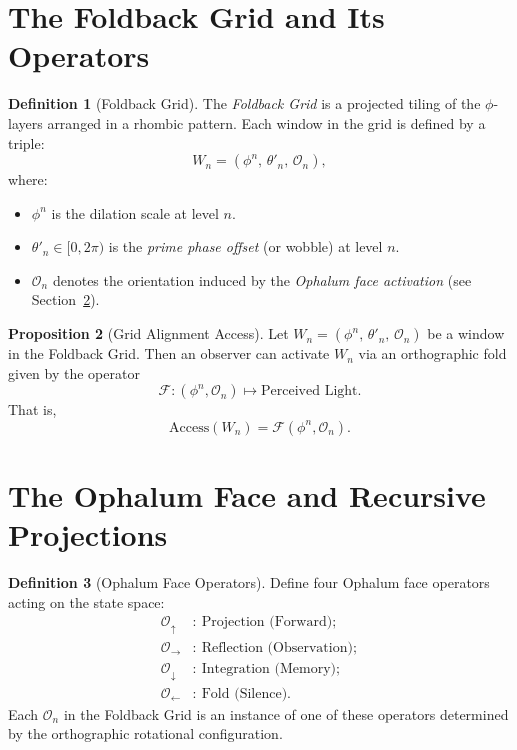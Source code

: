 \documentclass[12pt]{article}
\theoremstyle{definition}
\newtheorem{definition}{Definition}[section]
\newtheorem{proposition}[definition]{Proposition}
\begin{document}
\section{The Foldback Grid and Its Operators}

\begin{definition}[Foldback Grid]
The \emph{Foldback Grid} is a projected tiling of the $\phi$-layers arranged in a rhombic pattern. Each window in the grid is defined by a triple:
\[
W_n = \left( \phi^n,\, \theta'_n,\, \mathcal{O}_n \right),
\]
where:
\begin{itemize}
  \item $\phi^n$ is the dilation scale at level $n$.
  \item $\theta'_n \in [0,2\pi)$ is the \emph{prime phase offset} (or wobble) at level $n$.
  \item $\mathcal{O}_n$ denotes the orientation induced by the \emph{Ophalum face activation} (see Section~\ref{sec:ophalum}).
\end{itemize}
\end{definition}

\begin{proposition}[Grid Alignment Access]
Let $W_n = \left( \phi^n,\, \theta'_n,\, \mathcal{O}_n \right)$ be a window in the Foldback Grid. Then an observer can activate $W_n$ via an orthographic fold given by the operator
\[
\mathcal{F}: (\phi^n, \mathcal{O}_n) \mapsto \text{Perceived Light}.
\]
That is,
\[
\text{Access}(W_n) = \mathcal{F}\left( \phi^n, \mathcal{O}_n \right).
\]
\end{proposition}

\section{The Ophalum Face and Recursive Projections}
\label{sec:ophalum}

\begin{definition}[Ophalum Face Operators]
Define four Ophalum face operators acting on the state space:
\begin{align*}
\mathcal{O}_\uparrow &:\ \text{Projection (Forward)};\\[1mm]
\mathcal{O}_\rightarrow &:\ \text{Reflection (Observation)};\\[1mm]
\mathcal{O}_\downarrow &:\ \text{Integration (Memory)};\\[1mm]
\mathcal{O}_\leftarrow &:\ \text{Fold (Silence)}.
\end{align*}
Each $\mathcal{O}_n$ in the Foldback Grid is an instance of one of these operators determined by the orthographic rotational configuration.
\end{definition}
\end{document}
